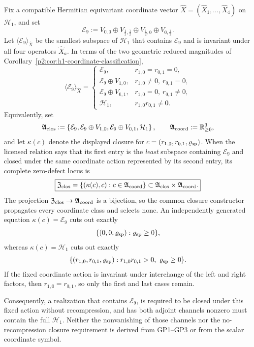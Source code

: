 \documentclass[11pt,a4paper]{article}
\begin{document}
\begin{proposition}
\label{p2c:prop:e9-coordinate-closure}
\label{p2c:thm:joint-coordinate-closure-locus}
Fix a compatible Hermitian equivariant coordinate vector
\(\widehat X=(\widehat X_1,\ldots,\widehat X_4)\) on \(\mathcal H_1\), and
set
\[
\mathcal E_9
:=
V_{0,0}\oplus V_{\frac12,\frac12}
\oplus V_{\frac12,0}\oplus V_{0,\frac12}.
\]
Let \(\langle\mathcal E_9\rangle_{\widehat X}\) be the smallest subspace of
\(\mathcal H_1\) that contains \(\mathcal E_9\) and is invariant under all
four operators \(\widehat X_a\).  In terms of the two geometric reduced
magnitudes of
Corollary~\ref{p2:cor:h1-coordinate-classification},
\[
\langle\mathcal E_9\rangle_{\widehat X}
=
\begin{cases}
\mathcal E_9,
&r_{1,0}=r_{0,1}=0,\\
\mathcal E_9\oplus V_{1,0},
&r_{1,0}\ne0,\ r_{0,1}=0,\\
\mathcal E_9\oplus V_{0,1},
&r_{1,0}=0,\ r_{0,1}\ne0,\\
\mathcal H_1,
&r_{1,0}r_{0,1}\ne0.
\end{cases}
\]
Equivalently, set
\[
 \mathfrak A_{\rm clos}
 :=\left\{
 \mathcal E_9,
 \mathcal E_9\oplus V_{1,0},
 \mathcal E_9\oplus V_{0,1},
 \mathcal H_1
 \right\},
 \qquad
 \mathfrak A_{\rm coord}:=\mathbb R_{\ge0}^3,
\]
and let \(\kappa(c)\) denote the displayed closure for
\(c=(r_{1,0},r_{0,1},\varrho_{\rm sp})\).  When the licensed relation says
that its first entry is the \emph{least} subspace containing
\(\mathcal E_9\) and closed under the same coordinate action represented by
its second entry, its complete zero-defect locus is
\[
 \boxed{
 \mathfrak Z_{\rm clos}
 =\{(\kappa(c),c):c\in\mathfrak A_{\rm coord}\}
 \subset\mathfrak A_{\rm clos}\times\mathfrak A_{\rm coord}.}
\]
The projection
\(\mathfrak Z_{\rm clos}\to\mathfrak A_{\rm coord}\) is a bijection, so the
common closure constructor propagates every coordinate class and selects
none.  An independently generated equation
\(\kappa(c)=\mathcal E_9\) cuts out exactly
\[
 \{(0,0,\varrho_{\rm sp}):\varrho_{\rm sp}\ge0\},
\]
whereas \(\kappa(c)=\mathcal H_1\) cuts out exactly
\[
 \{(r_{1,0},r_{0,1},\varrho_{\rm sp}):
 r_{1,0}r_{0,1}>0,\ \varrho_{\rm sp}\ge0\}.
\]
If the fixed coordinate action is invariant under interchange of the left and
right factors, then \(r_{1,0}=r_{0,1}\), so only the first and last cases
remain.

Consequently, a realization that contains \(\mathcal E_9\), is required to
be closed under this fixed action without recompression, and has both adjoint
channels nonzero must contain the full \(\mathcal H_1\).  Neither the
nonvanishing of those channels nor the no-recompression closure requirement
is derived from GP1--GP3 or from the scalar coordinate symbol.
\end{proposition}
\end{document}
